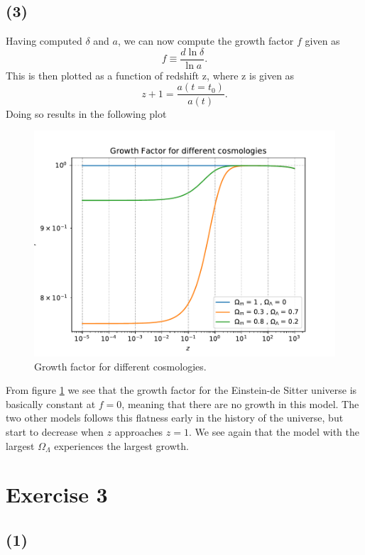 \documentclass[a4paper]{article}
\begin{document}
\subsection*{(3)}
Having computed $\delta$ and $a$, we can now compute the growth factor $f$ given as 
\begin{equation}
    f \equiv \frac{d \ln \delta}{\ln a}.
\end{equation}
This is then plotted as a function of redshift z, where z is given as
\begin{equation}
    z +1 = \frac{a(t=t_0)}{a(t)}.
\end{equation}
Doing so results in the following plot 

\begin{figure}[h]
  \centering
  \includegraphics[width=0.9\linewidth]{growth.pdf}
  \caption{Growth factor for different cosmologies.}
  \label{fig:2}
\end{figure}
From figure \ref{fig:2} we see that the growth factor for the Einstein-de Sitter universe is basically constant at $f = 0$, meaning that there are no growth in this model. The two other models follows this flatness early in the history of the universe, but start to decrease when $z$ approaches $z =1$. We see again that the model with the largest $\Omega_\Lambda$ experiences the largest growth.

\section*{Exercise 3}

\subsection*{ (1) }
\end{document}
